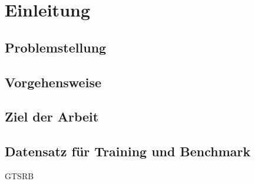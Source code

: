 \chapter{Einleitung}
\section{Problemstellung}
\section{Vorgehensweise}
\section{Ziel der Arbeit}
\section{Datensatz für Training und Benchmark}
\ac{GTSRB}
